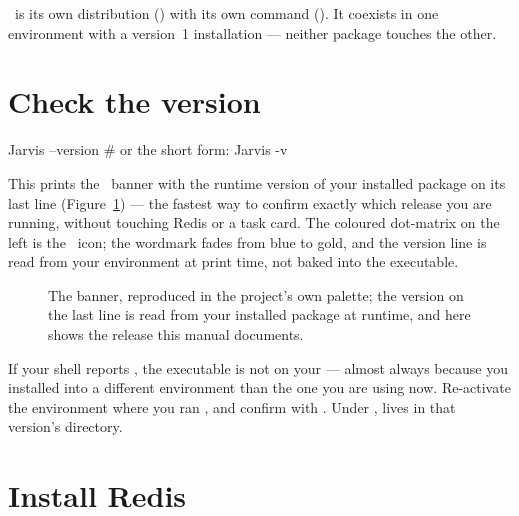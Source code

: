 \begin{jnote}
\Jtwo\ is its own distribution () with its own command
(). It coexists in one environment with a version~1 installation ---
neither package touches the other.
\end{jnote}

\section{Check the version}
\label{sec:verify-version}

\begin{terminal}
\begin{jcmd}
Jarvis --version    # or the short form: Jarvis -v
\end{jcmd}
\end{terminal}

\noindent This prints the \Jarvis\ banner with the runtime version of your installed
package on its last line (Figure~\ref{fig:version-banner}) --- the fastest way to
confirm exactly which release you are running, without touching Redis or a task card.
The coloured dot-matrix on the left is the \Jarvis\ icon; the wordmark fades from blue
to gold, and the version line is read from your environment at print time, not baked
into the executable.

\begin{figure}[ht]
\centering
\JarvisVersionBanner
\caption[The  banner.]{The  banner,
reproduced in the project's own palette; the version on the last line is read from your
installed package at runtime, and here shows the release this manual documents.}
\label{fig:version-banner}
\end{figure}

\begin{jwarn}
If your shell reports , the executable is not on your
 --- almost always because you installed into a different environment than
the one you are using now. Re-activate the environment where you ran ,
and confirm with . Under ,  lives in that
version's  directory.
\end{jwarn}

\section{Install Redis}
\label{sec:redis-install}

